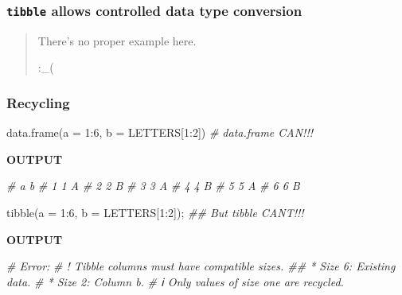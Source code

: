 \documentclass[
]{article}
\newenvironment{Shaded}{}{}
\newcommand{\AttributeTok}[1]{\textcolor[rgb]{0.49,0.56,0.16}{#1}}
\newcommand{\CommentTok}[1]{\textcolor[rgb]{0.38,0.63,0.69}{\textit{#1}}}
\newcommand{\DecValTok}[1]{\textcolor[rgb]{0.25,0.63,0.44}{#1}}
\newcommand{\DocumentationTok}[1]{\textcolor[rgb]{0.73,0.13,0.13}{\textit{#1}}}
\newcommand{\FunctionTok}[1]{\textcolor[rgb]{0.02,0.16,0.49}{#1}}
\newcommand{\NormalTok}[1]{#1}
\newcommand{\SpecialCharTok}[1]{\textcolor[rgb]{0.25,0.44,0.63}{#1}}
\begin{document}
\hypertarget{tibble-allows-controlled-data-type-conversion}{%
\subsubsection{\texorpdfstring{\texttt{tibble} allows controlled data
type
conversion}{tibble allows controlled data type conversion}}\label{tibble-allows-controlled-data-type-conversion}}

\begin{quote}
There's no proper example here.

:\_(
\end{quote}

\hypertarget{recycling}{%
\subsubsection{Recycling}\label{recycling}}

\begin{Shaded}
\begin{Highlighting}[]
\FunctionTok{data.frame}\NormalTok{(}\AttributeTok{a =} \DecValTok{1}\SpecialCharTok{:}\DecValTok{6}\NormalTok{, }\AttributeTok{b =}\NormalTok{ LETTERS[}\DecValTok{1}\SpecialCharTok{:}\DecValTok{2}\NormalTok{]) }\CommentTok{\# data.frame CAN!!!}
\end{Highlighting}
\end{Shaded}

\textbf{OUTPUT}

\begin{Shaded}
\begin{Highlighting}[]
\CommentTok{\#   a b }
\CommentTok{\# 1 1 A }
\CommentTok{\# 2 2 B }
\CommentTok{\# 3 3 A }
\CommentTok{\# 4 4 B }
\CommentTok{\# 5 5 A }
\CommentTok{\# 6 6 B}
\end{Highlighting}
\end{Shaded}

\begin{Shaded}
\begin{Highlighting}[]
\FunctionTok{tibble}\NormalTok{(}\AttributeTok{a =} \DecValTok{1}\SpecialCharTok{:}\DecValTok{6}\NormalTok{, }\AttributeTok{b =}\NormalTok{ LETTERS[}\DecValTok{1}\SpecialCharTok{:}\DecValTok{2}\NormalTok{]); }\DocumentationTok{\#\# But tibble CAN\textquotesingle{}T!!!}
\end{Highlighting}
\end{Shaded}

\textbf{OUTPUT}

\begin{Shaded}
\begin{Highlighting}[]
\CommentTok{\# Error:}
\CommentTok{\# ! Tibble columns must have compatible sizes. \#\# * Size 6: Existing data.}
\CommentTok{\# * Size 2: Column \textasciigrave{}b\textasciigrave{}.}
\CommentTok{\# ℹ Only values of size one are recycled.}
\end{Highlighting}
\end{Shaded}
\end{document}

